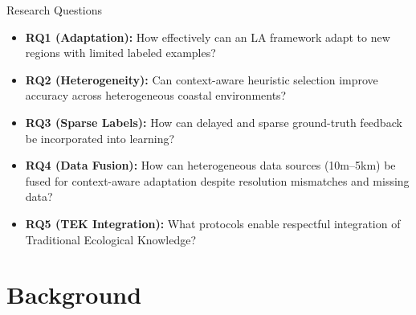 \documentclass[10pt,xcolor={table,dvipsnames}]{beamer}
\begin{document}
\begin{frame}{Research Questions}

\begin{itemize}
  \item \textbf{RQ1 (Adaptation):} How effectively can an LA framework adapt to new regions with limited labeled examples?

  \vspace{0.3em}
  \item \textbf{RQ2 (Heterogeneity):} Can context-aware heuristic selection improve accuracy across heterogeneous coastal environments?

  \vspace{0.3em}
  \item \textbf{RQ3 (Sparse Labels):} How can delayed and sparse ground-truth feedback be incorporated into learning?

  \vspace{0.3em}
  \item \textbf{RQ4 (Data Fusion):} How can heterogeneous data sources (10m--5km) be fused for context-aware adaptation despite resolution mismatches and missing data?

  \vspace{0.3em}
  \item \textbf{RQ5 (TEK Integration):} What protocols enable respectful integration of Traditional Ecological Knowledge?
\end{itemize}

\end{frame}

\section{Background}
\end{document}
